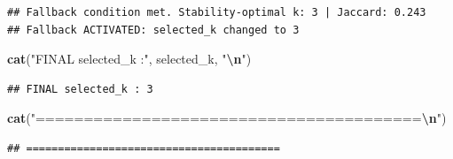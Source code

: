 \documentclass[
]{article}
\newenvironment{Shaded}{\begin{snugshade}}{\end{snugshade}}
\newcommand{\FunctionTok}[1]{\textcolor[rgb]{0.13,0.29,0.53}{\textbf{#1}}}
\newcommand{\NormalTok}[1]{#1}
\newcommand{\SpecialCharTok}[1]{\textcolor[rgb]{0.81,0.36,0.00}{\textbf{#1}}}
\newcommand{\StringTok}[1]{\textcolor[rgb]{0.31,0.60,0.02}{#1}}
\begin{document}
\begin{verbatim}
## Fallback condition met. Stability-optimal k: 3 | Jaccard: 0.243 
## Fallback ACTIVATED: selected_k changed to 3
\end{verbatim}

\begin{Shaded}
\begin{Highlighting}[]
\FunctionTok{cat}\NormalTok{(}\StringTok{"FINAL selected\_k :"}\NormalTok{, selected\_k, }\StringTok{"}\SpecialCharTok{\textbackslash{}n}\StringTok{"}\NormalTok{)}
\end{Highlighting}
\end{Shaded}

\begin{verbatim}
## FINAL selected_k : 3
\end{verbatim}

\begin{Shaded}
\begin{Highlighting}[]
\FunctionTok{cat}\NormalTok{(}\StringTok{"========================================}\SpecialCharTok{\textbackslash{}n}\StringTok{"}\NormalTok{)}
\end{Highlighting}
\end{Shaded}

\begin{verbatim}
## ========================================
\end{verbatim}
\end{document}
